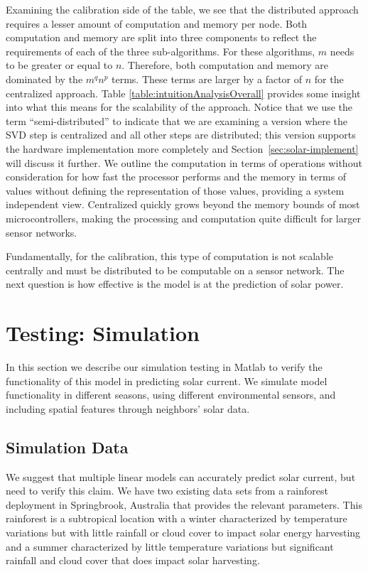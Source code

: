 \documentclass[prodmode,acmtosn]{acmsmall}
\begin{document}
Examining the calibration side of the table, we see that the distributed approach requires a lesser amount of computation and memory per node.
Both computation and memory are split into three components to reflect the requirements of each of the three sub-algorithms.
For these algorithms, $m$ needs to be greater or equal to $n$.
Therefore, both computation and memory are dominated by the $m^qn^p$ terms.
These terms are larger by a factor of $n$ for the centralized approach.
Table \ref{table:intuitionAnalysisOverall} provides some insight into what this means for the scalability of the approach.
Notice that we use the term ``semi-distributed'' to indicate that we are examining a version where the SVD step is centralized and all other steps are distributed; this version supports the hardware implementation more completely and Section~\ref{sec:solar-implement} will discuss it further.
We outline the computation in terms of operations without consideration for how fast the processor performs and the memory in terms of values without defining the representation of those values, providing a system independent view.
Centralized quickly grows beyond the memory bounds of most microcontrollers, making the processing and computation quite difficult for larger sensor networks.

Fundamentally, for the calibration, this type of computation is not scalable centrally and must be distributed to be computable on a sensor network.
The next question is how effective is the model is at the prediction of solar power.

\section{Testing: Simulation} \label{sec:solar-test}
In this section we describe our simulation testing in Matlab to verify the functionality of this model in predicting solar current.
We simulate model functionality in different seasons, using different environmental sensors, and including spatial features through neighbors' solar data.

\subsection{Simulation Data}\label{sec:simulation}
We suggest that multiple linear models can accurately predict solar current, but need to verify this claim.
We have two existing data sets from a rainforest deployment in Springbrook, Australia that provides the relevant parameters.
This rainforest is a subtropical location with a winter characterized by temperature variations but with little rainfall or cloud cover to impact solar energy harvesting and a summer characterized by little temperature variations but significant rainfall and cloud cover that does impact solar harvesting.
\end{document}
